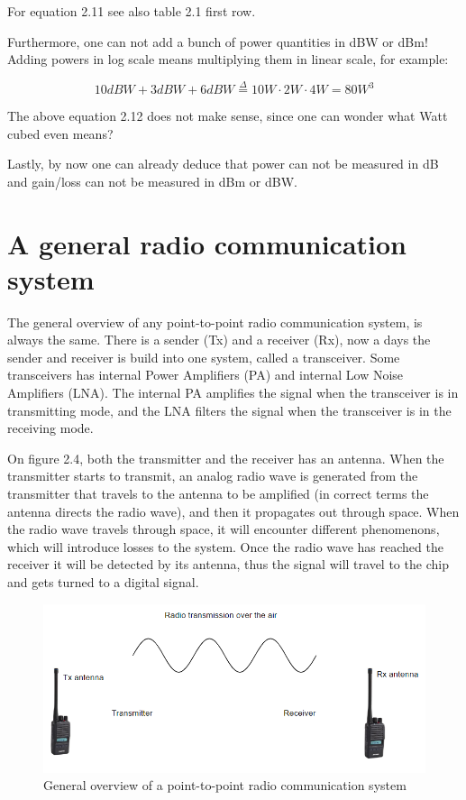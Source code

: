 For equation 2.11 see also table 2.1 first row. 

Furthermore, one can not add a bunch of power quantities in dBW or dBm! Adding powers in log scale means multiplying them in linear scale, for example:  

\begin{equation}
    10dBW + 3dBW + 6dBW \overset{\Delta}{=} 10W \cdot 2W \cdot 4W = 80W^3
\end{equation}

The above equation 2.12 does not make sense, since one can wonder what Watt cubed even means?

Lastly, by now one can already deduce that power can not be measured in dB and gain/loss can not be measured in dBm or dBW. 

\section{A general radio communication system}
The general overview of any point-to-point radio communication system, is always the same. There is a sender (Tx) and a receiver (Rx), now a days the sender and receiver is build into one system, called a transceiver. Some transceivers has internal Power Amplifiers (PA) and internal Low Noise Amplifiers (LNA). The internal PA amplifies the signal when the transceiver is in transmitting mode, and the LNA filters the signal when the transceiver is in the receiving mode.

On figure 2.4, both the transmitter and the receiver has an antenna. When the transmitter starts to transmit, an analog radio wave is generated from the transmitter that travels to the antenna to be amplified (in correct terms the antenna directs the radio wave), and then it propagates out through space. When the radio wave travels through space, it will encounter different phenomenons, which will introduce losses to the system. Once the radio wave has reached the receiver it will be detected by its antenna, thus the signal will travel to the chip and gets turned to a digital signal.

\begin{figure}[h]
\centering
\includegraphics[scale=0.55]{figures/GeneralOverview.PNG}
\caption{General overview of a point-to-point radio communication system}
\end{figure}


